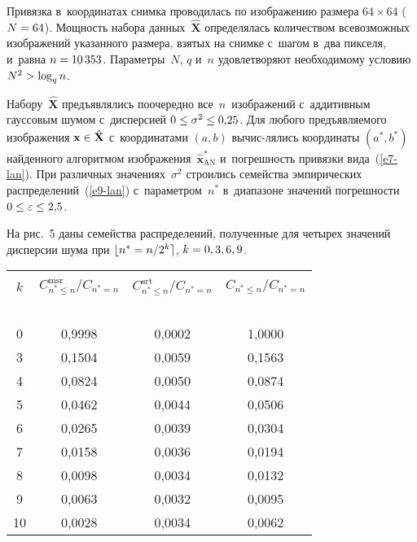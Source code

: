 \begin{multicols}{2}


Привязка в~координатах снимка
 проводилась по 
изображению размера $64\times 64$ ($N\hm=64$). Мощность набора 
данных~$\hat{\mathbf{X}}$ определялась количеством всевозможных 
изображений указанного размера, взятых на снимке с~шагом в~два пикселя, 
и~равна $n\hm=10\,353$. Параметры~$N$, $q$ и~$n$ удовлетворяют необходимому 
условию $N^2\hm>\log_q n$. 

Набору~$\hat{\mathbf{X}}$ предъявлялись 
поочередно все~$n$~изоб\-ра\-же\-ний с~аддитивным гауссовым шумом 
с~дис\-пер\-си\-ей $0\hm\leq \sigma^2\hm\leq 0{,}25$. Для любого предъяв\-ля\-емо\-го 
изображения $\mathbf{x}\hm\in \hat{\mathbf{X}}$ с~координатами $(a,b)$ 
вычис-\linebreak лялись координаты $(a^*,b^*)$ найденного алгоритмом 
изображения~$\hat{\mathbf{x}}^*_{\mathrm{AN}}$ и~погрешность привязки 
вида~(\ref{e7-lan}). При различных значениях~$\sigma^2$ строились семейства 
эмпирических распределений~(\ref{e9-lan}) с~параметром~$n^*$ 
в~диапазоне значений погрешности $0\hm\leq \varepsilon\hm\leq 2{,}5$. 
{

}

На 
рис.~5 даны семейства распределений, полученные для четырех значений 
дисперсии шума при $\lfloor n^*\hm= n/2^k\rceil$, $k\hm=0,3,6,9$. 

\begin{table*}\small %
\begin{center}
\parbox{260pt}{

}

\vspace*{2ex}

\tabcolsep=9pt
\begin{tabular}{|c|c|c|c|}
\hline
&&&\\[-9pt]
 $k$& $C^{\mathrm{msr}}_{n^*\leq n}/C_{n^*=n}$ &
  $C^{\mathrm{srt}}_{n^*\leq  n}/C_{n^*=n}$&  $C_{n^*\leq n}/C_{n^*=n}$\\
  \ & \ &\ &\ \\[-9pt]
  \hline
 0&0,9998& 0,0002& 1,0000\\
 3&0,1504& 0,0059& 0,1563\\
 4& 0,0824& 0,0050& 0,0874\\
 5&0,0462& 0,0044& 0,0506\\
 6&0,0265& 0,0039& 0,0304\\
 7& 0,0158& 0,0036& 0,0194\\
 8& 0,0098& 0,0034& 0,0132\\
 9&0,0063& 0,0032& 0,0095\\
 10\hphantom{9}& 0,0028&0,0034& 0,0062\\
  \hline
  \end{tabular}
 \end{center}
 \vspace*{6pt}
 \end{table*}


\end{multicols}
